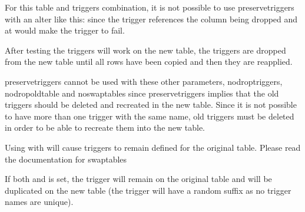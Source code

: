 \documentclass[letterpaper,10pt,english]{sphinxmanual}
\begin{document}
\begin{fulllineitems}
\sphinxAtStartPar
For this table and triggers combination, it is not possible to use \textendash{}preserve\sphinxhyphen{}triggers
with an \textendash{}alter like this:  since the trigger references the column
being dropped and at would make the trigger to fail.

\sphinxAtStartPar
After testing the triggers will work on the new table, the triggers are
dropped from the new table until all rows have been copied and then they are
re\sphinxhyphen{}applied.

\sphinxAtStartPar
\textendash{}preserve\sphinxhyphen{}triggers cannot be used with these other parameters, \textendash{}no\sphinxhyphen{}drop\sphinxhyphen{}triggers,
\textendash{}no\sphinxhyphen{}drop\sphinxhyphen{}old\sphinxhyphen{}table and \textendash{}no\sphinxhyphen{}swap\sphinxhyphen{}tables since \textendash{}preserve\sphinxhyphen{}triggers implies that
the old triggers should be deleted and recreated in the new table.
Since it is not possible to have more than one trigger with the same name, old triggers
must be deleted in order to be able to recreate them into the new table.

\sphinxAtStartPar
Using  with  will cause triggers to remain
defined for the original table.
Please read the documentation for \textendash{}swap\sphinxhyphen{}tables

\sphinxAtStartPar
If both  and  is set, the trigger will remain
on the original table and will be duplicated on the new table
(the trigger will have a random suffix as no trigger names are unique).

\end{fulllineitems}

\end{document}
